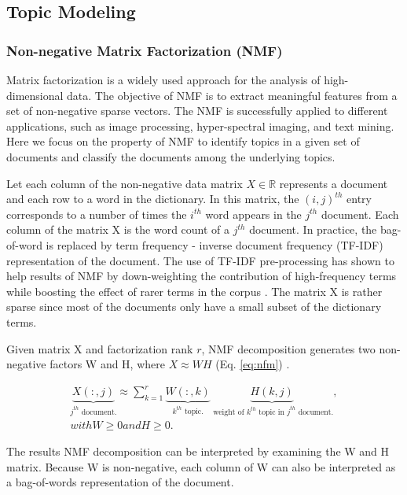 \subsection{Topic Modeling}

\subsubsection{Non-negative Matrix Factorization (NMF)} 
Matrix factorization is a widely used approach for the analysis of high-dimensional data. The objective of NMF is to extract meaningful features from a set of non-negative sparse vectors. The NMF is successfully applied to different applications, such as image processing, hyper-spectral imaging,  and text mining.  Here we focus on the property of NMF to identify topics in a given set of documents and classify the documents among the underlying topics.

Let each column of the non-negative data matrix $X \in \mathbb{R}$ represents a document and each row to a word in the dictionary. In this matrix, the $(i, j)^{th}$ entry corresponds to a number of times the $i^{th}$ word appears in the $j^{th}$ document. Each column of the matrix X is the word count of a $j^{th}$ document. In practice, the bag-of-word is replaced by term frequency - inverse document frequency (TF-IDF) representation of the document. The use of TF-IDF pre-processing has shown to help results of NMF by down-weighting the contribution of high-frequency terms while boosting the effect of rarer terms in the corpus \cite{Greene2016,Gillis2014}. The matrix X is rather sparse since most of the documents only have a small subset of the dictionary terms.

Given matrix X and factorization rank $r$, NMF decomposition generates two non-negative factors W and H, where $X \approx W H$ (Eq. \ref{eq:nfm}) \cite{Lee1999}. 

\begin{multline}\label{eq:nfm}
\underbrace{X(:,j)}_\text{$j^{th}$ document.} \approx \sum_{k=1}^{r} \underbrace{W(:,k)}_\text{$k^{th}$ topic.} \underbrace{H(k,j)}_\text{ weight of $k^{th}$ topic in $j^{th}$ document.} , \\
with W \geq 0 and H \geq 0.
\end{multline}

The results NMF decomposition can be interpreted by examining the W and H matrix. Because W is non-negative, each column of W can also be interpreted as a bag-of-words representation of the document.


